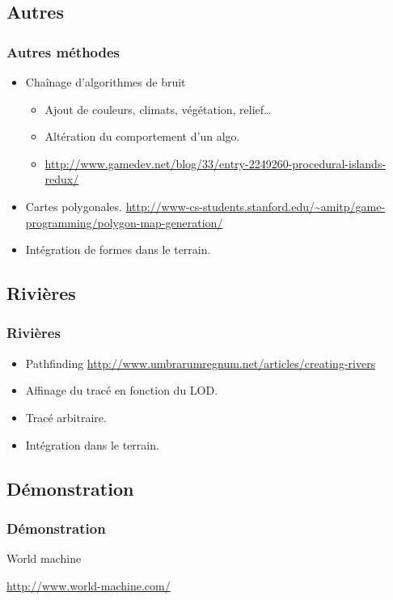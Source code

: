 \documentclass{beamer}
\begin{document}
\subsection{Autres}
\begin{frame}
  \frametitle{Autres méthodes}
  \begin{itemize}
  \item Chaînage d'algorithmes de bruit
    \begin{itemize}
    \item Ajout de couleurs, climats, végétation, relief\dots{}
    \item Altération du comportement d'un algo.
    \item {\tiny\url{http://www.gamedev.net/blog/33/entry-2249260-procedural-islands-redux/}}
    \end{itemize}
  \item Cartes polygonales. {\tiny\url{http://www-cs-students.stanford.edu/~amitp/game-programming/polygon-map-generation/}}
  \item Intégration de formes dans le terrain.
  \end{itemize}
\end{frame}

\subsection{Rivières}

\begin{frame}
  \frametitle{Rivières}
  \begin{itemize}
  \item Pathfinding {\tiny\url{http://www.umbrarumregnum.net/articles/creating-rivers}}
  \item Affinage du tracé en fonction du LOD.
  \item Tracé arbitraire.
  \item Intégration dans le terrain.
  \end{itemize}
\end{frame}

\subsection{Démonstration}
\begin{frame}
  \frametitle{Démonstration}
  \begin{center}
  {\Huge World machine}
  
  \vspace{1em}
  \url{http://www.world-machine.com/}
  \end{center}
\end{frame}
\end{document}
